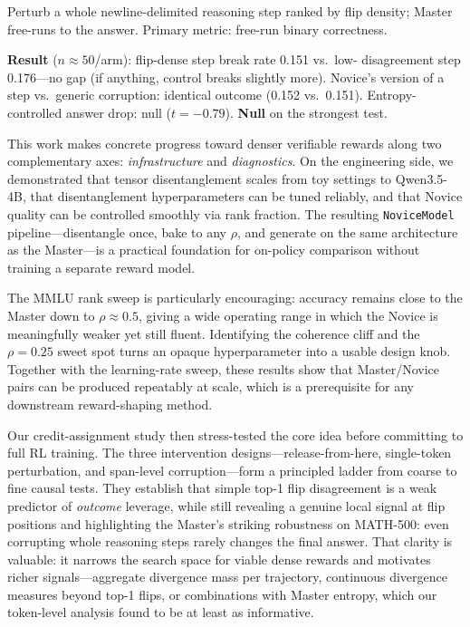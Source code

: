 \documentclass[times, 10pt,twocolumn]{article}
\begin{document}

Perturb a whole newline-delimited reasoning step ranked by flip density; Master
free-runs to the answer. Primary metric: free-run binary correctness.

\textbf{Result} ($n{\approx}50$/arm): flip-dense step break rate 0.151 vs.\ low-
disagreement step 0.176---no gap (if anything, control breaks slightly more).
Novice's version of a step vs.\ generic corruption: identical outcome (0.152 vs.\
0.151). Entropy-controlled answer drop: null ($t{=}{-}0.79$). \textbf{Null} on
the strongest test.



This work makes concrete progress toward denser verifiable rewards along two
complementary axes: \emph{infrastructure} and \emph{diagnostics}. On the
engineering side, we demonstrated that tensor disentanglement scales from toy
settings to Qwen3.5-4B, that disentanglement hyperparameters can be tuned
reliably, and that Novice quality can be controlled smoothly via rank fraction.
The resulting \texttt{NoviceModel} pipeline---disentangle once, bake to any
$\rho$, and generate on the same architecture as the Master---is a practical
foundation for on-policy comparison without training a separate reward model.

The MMLU rank sweep is particularly encouraging: accuracy remains close to the
Master down to $\rho \approx 0.5$, giving a wide operating range in which the
Novice is meaningfully weaker yet still fluent. Identifying the coherence cliff
and the $\rho{=}0.25$ sweet spot turns an opaque hyperparameter into a usable
design knob. Together with the learning-rate sweep, these results show that
Master/Novice pairs can be produced repeatably at scale, which is a prerequisite
for any downstream reward-shaping method.

Our credit-assignment study then stress-tested the core idea before committing to
full RL training. The three intervention designs---release-from-here, single-token
perturbation, and span-level corruption---form a principled ladder from coarse to
fine causal tests. They establish that simple top-1 flip disagreement is a weak
predictor of \emph{outcome} leverage, while still revealing a genuine local signal
at flip positions and highlighting the Master's striking robustness on MATH-500:
even corrupting whole reasoning steps rarely changes the final answer. That
clarity is valuable: it narrows the search space for viable dense rewards and
motivates richer signals---aggregate divergence mass per trajectory, continuous
divergence measures beyond top-1 flips, or combinations with Master entropy,
which our token-level analysis found to be at least as informative.
\end{document}
